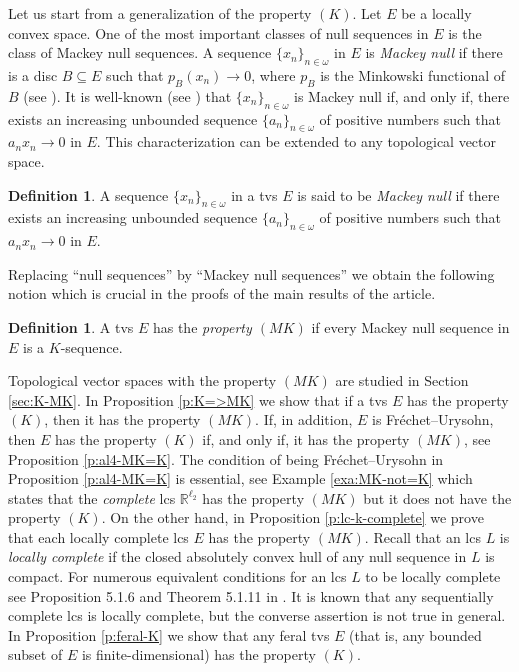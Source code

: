 \documentclass[preprint,11pt]{elsarticle}
\theoremstyle{definition}
\newtheorem{definition}[theorem]{Definition}
\theoremstyle{remark}
\numberwithin{equation}{section}
\numberwithin{theorem}{section}
\newcommand{\w}{\omega}
\newcommand{\IR}{\mathbb{R}}
\begin{document}
Let us start from a generalization of the property $(K)$. Let $E$ be a locally convex space. One of the most important classes of null sequences in $E$ is the class of Mackey null sequences. A sequence $\{x_n\}_{n\in\w}$ in $E$  is  {\em Mackey null}  if there is a disc $B\subseteq E$ such that $p_B(x_n)\to 0$, where $p_B$ is the Minkowski functional of $B$ (see \cite[2.10.17~Definition]{BS2017tvs}). It is well-known (see \cite[Lemma~2.10.18]{BS2017tvs}) that $\{x_n\}_{n\in\w}$ is Mackey null if, and only if, there exists an increasing unbounded sequence  $\{a_n\}_{n\in\w}$ of positive numbers such that $a_n x_n \to 0$ in $E$. This characterization can be extended to any topological vector space.

\begin{definition}\label{def:mc}
A  sequence $\{x_n\}_{n\in\w}$ in a tvs $E$ is said to be  {\em Mackey null}  if there exists an increasing unbounded sequence  $\{a_n\}_{n\in\w}$ of positive numbers such that $a_n x_n \to 0$ in $E$.
\end{definition}

Replacing ``null sequences'' by ``Mackey null sequences'' we obtain the following notion which is crucial in the proofs of the main results of the article.

\begin{definition}\label{def:MK-property}
A tvs $E$ has the {\em property $(MK)$} if every Mackey null sequence in $E$ is a $K$-sequence.
\end{definition}



Topological vector spaces with the property $(MK)$ are studied in Section \ref{sec:K-MK}. In Proposition \ref{p:K=>MK} we show that if a tvs $E$ has the property $(K)$, then it has the property $(MK)$. If, in addition, $E$ is Fr\'{e}chet--Urysohn, then $E$ has the property $(K)$ if, and only if, it has the property $(MK)$, see Proposition \ref{p:al4-MK=K}. The condition of being Fr\'{e}chet--Urysohn in Proposition \ref{p:al4-MK=K} is essential, see Example \ref{exa:MK-not=K} which states that the {\em complete} lcs $\IR^{\ell_2}$ has the property $(MK)$ but it does not have the property $(K)$. On the other hand, in Proposition \ref{p:lc-k-complete} we prove that each  locally complete lcs $E$ has the property $(MK)$. Recall that an lcs $L$ is {\em locally complete}  if the closed absolutely convex hull of any null sequence in $L$ is compact. For numerous equivalent conditions for an  lcs $L$ to be locally complete see Proposition 5.1.6 and Theorem 5.1.11 in \cite{PB}. It is known that any sequentially complete lcs is locally complete, but the converse assertion is not true in general. In Proposition \ref{p:feral-K} we show that any feral tvs $E$ (that is, any bounded subset of $E$ is finite-dimensional) has the property $(K)$.
\end{document}
